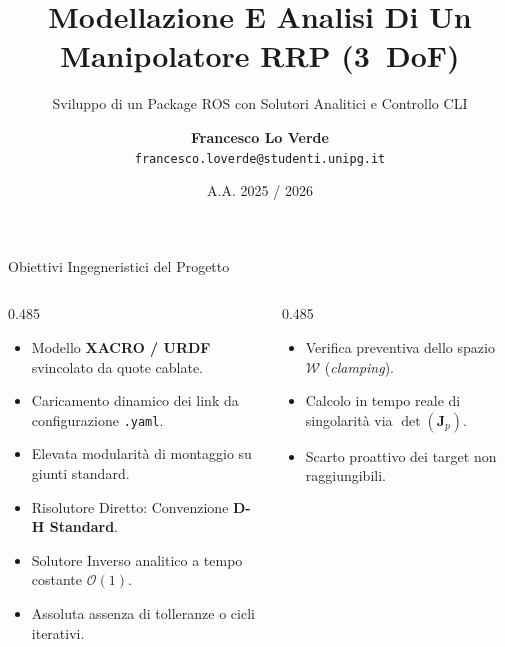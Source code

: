 \documentclass[aspectratio=169, 10pt]{beamer}
\title{Modellazione E Analisi Di Un Manipolatore RRP \mbox{(3 DoF)}}
\subtitle{Sviluppo di un Package ROS con Solutori Analitici e Controllo CLI}
\author[Francesco Lo Verde]{\textbf{Francesco Lo Verde}\texorpdfstring{\\[0.10cm]{\footnotesize\texttt{francesco.loverde@studenti.unipg.it}}}{}}
\institute{Università degli Studi di Perugia \quad---\quad Corso di Industrial Robotics}
\date{A.A. 2025 / 2026}
\begin{document}
\begin{frame}[plain]
    \titlepage
\end{frame}

\begin{frame}{Obiettivi Ingegneristici del Progetto}
    \begin{columns}[onlytextwidth, T]
        \begin{column}{0.485\textwidth}
            \begin{tcolorbox}[moderncard, title={\color{UniPgNavy}Modellazione Parametrica}, equal height group=obj_top]
                \footnotesize
                \begin{itemize}
                    \setlength{\itemsep}{1.5pt}
                    \item Modello \textbf{XACRO / URDF} svincolato da quote cablate.
                    \item Caricamento dinamico dei link da configurazione \texttt{.yaml}.
                    \item Elevata modularità di montaggio su giunti standard.
                \end{itemize}
            \end{tcolorbox}

            \begin{tcolorbox}[moderncard, title={\color{TechCyan}Cinematica in Forma Chiusa}, equal height group=obj_bot]
                \footnotesize
                \begin{itemize}
                    \setlength{\itemsep}{1.5pt}
                    \item Risolutore Diretto: Convenzione \textbf{D-H Standard}.
                    \item Solutore Inverso analitico a tempo costante $\mathcal{O}(1)$.
                    \item Assoluta assenza di tolleranze o cicli iterativi.
                \end{itemize}
            \end{tcolorbox}
        \end{column}

        \begin{column}{0.485\textwidth}
            \begin{tcolorbox}[moderncard, title={\color{AlertRed}Controllo e Robustezza}, equal height group=obj_top]
                \footnotesize
                \begin{itemize}
                    \setlength{\itemsep}{1.5pt}
                    \item Verifica preventiva dello spazio $\mathcal{W}$ (\textit{clamping}).
                    \item Calcolo in tempo reale di singolarità via $\det(\mathbf{J}_p)$.
                    \item Scarto proattivo dei target non raggiungibili.
                \end{itemize}
            \end{tcolorbox}


\end{column}
\end{columns}
\end{frame}
\end{document}
